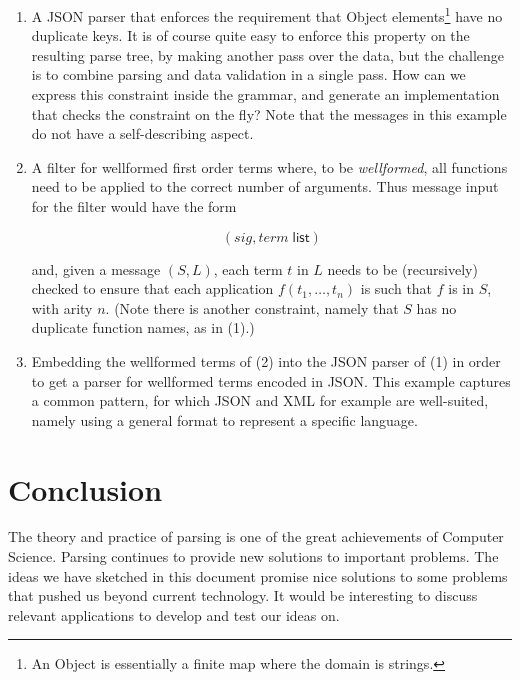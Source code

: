 \documentclass{article}
\newcommand{\konst}[1]{\ensuremath{\mathsf{#1}}}
\theoremstyle{definition}
\begin{document}
\begin{enumerate}

\item A JSON parser that enforces the requirement that \textsf{Object}
  elements\footnote{An \textsf{Object} is essentially a finite map
    where the domain is strings.} have no duplicate keys. It is of
  course quite easy to enforce this property on the resulting parse
  tree, by making another pass over the data, but the challenge is to
  combine parsing and data validation in a single pass. How can we
  express this constraint inside the grammar, and generate an
  implementation that checks the constraint on the fly? Note that the
  messages in this example do not have a self-describing aspect.

\item A filter for wellformed first order terms where, to be
  \emph{wellformed}, all functions need to be applied to the correct number
  of arguments. Thus message input for the filter would have the form

  \[ ( \mathit{sig} , \mathit{term}\; \konst{list} ) \]

  and, given a message $(S, L)$, each term $t$ in $L$
  needs to be (recursively) checked to ensure that each application
  $f(t_1,\ldots,t_n)$ is such that $f$ is in $S$, with arity $n$.
  (Note there is another constraint, namely that $S$ has no duplicate
  function names, as in (1).)

\item Embedding the wellformed terms of (2) into the JSON parser of
  (1) in order to get a parser for wellformed terms encoded in
  JSON. This example captures a common pattern, for which JSON and XML
  for example are well-suited, namely using a general format to
  represent a specific language.

\end{enumerate}

\section{Conclusion}

The theory and practice of parsing is one of the great achievements of
Computer Science. Parsing continues to provide new solutions to
important problems. The ideas we have sketched in this document
promise nice solutions to some problems that pushed us beyond current
technology. It would be interesting to discuss relevant applications
to develop and test our ideas on.
\end{document}
